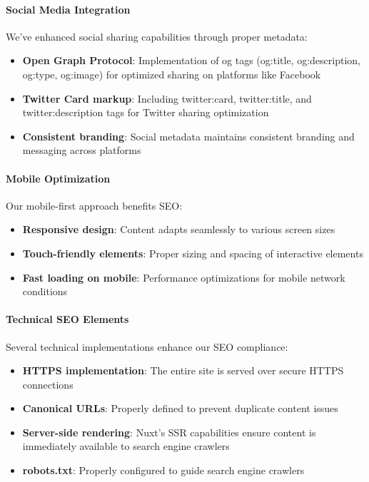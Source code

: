 \paragraph{Social Media Integration}
We've enhanced social sharing capabilities through proper metadata:

\begin{itemize}
    \item \textbf{Open Graph Protocol}: Implementation of og tags (og:title, og:description, og:type, og:image) for optimized sharing on platforms like Facebook
    \item \textbf{Twitter Card markup}: Including twitter:card, twitter:title, and twitter:description tags for Twitter sharing optimization
    \item \textbf{Consistent branding}: Social metadata maintains consistent branding and messaging across platforms
\end{itemize}

\paragraph{Mobile Optimization}
Our mobile-first approach benefits SEO:

\begin{itemize}
    \item \textbf{Responsive design}: Content adapts seamlessly to various screen sizes
    \item \textbf{Touch-friendly elements}: Proper sizing and spacing of interactive elements
    \item \textbf{Fast loading on mobile}: Performance optimizations for mobile network conditions
\end{itemize}

\paragraph{Technical SEO Elements}
Several technical implementations enhance our SEO compliance:

\begin{itemize}
    \item \textbf{HTTPS implementation}: The entire site is served over secure HTTPS connections
    \item \textbf{Canonical URLs}: Properly defined to prevent duplicate content issues
    \item \textbf{Server-side rendering}: Nuxt's SSR capabilities ensure content is immediately available to search engine crawlers
    \item \textbf{robots.txt}: Properly configured to guide search engine crawlers
\end{itemize}

